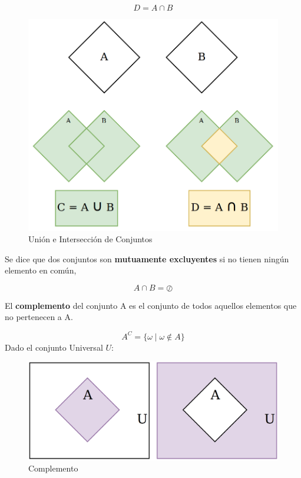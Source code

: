 \begin{equation*}
D = A \cap B
\end{equation*}

\begin{figure}[H]
\centering
\includegraphics[scale=0.3]{Figures/Conjuntos.png}
    \caption{Unión e Intersección de Conjuntos}
    \label{fig:UnioneInterseccion}
\end{figure}

Se dice que dos conjuntos son \textbf{mutuamente excluyentes} si no tienen ningún elemento en común, 

\begin{equation*}
A \cap B = \oslash
\end{equation*}

El \textbf{complemento} del conjunto A es el conjunto de todos aquellos elementos que no pertenecen a A.

\begin{equation*}
A^{C} = \{\omega \mid \omega \notin A\}
\end{equation*}
Dado el conjunto Universal $U$:
\begin{figure}[H]
\centering
\includegraphics[scale=0.17]{Figures/Conjuntos_Complemento.png}
    \caption{Complemento}
    \label{fig:Complemento}
\end{figure}

